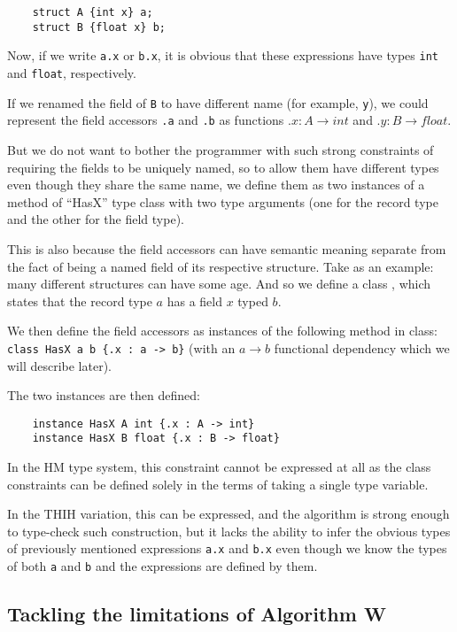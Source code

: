 \begin{lstlisting}
    struct A {int x} a;
    struct B {float x} b;
\end{lstlisting}

Now, if we write \lstinline{a.x} or \lstinline{b.x}, it is obvious that these expressions have types \lstinline{int} and \lstinline{float}, respectively.

If we renamed the field of \lstinline{B} to have different name (for example, \lstinline{y}), we could represent the field accessors \lstinline{.a} and \lstinline{.b} as functions $.x : A \to int$ and $.y : B \to float$.

But we do not want to bother the programmer with such strong constraints of requiring the fields to be uniquely named, so to allow them have different types even though they share the same name, we define them as two instances of a method of ``HasX'' type class with two type arguments (one for the record type and the other for the field type).

This is also because the field accessors can have semantic meaning separate from the fact of being a named field of its respective structure. Take  as an example: many different structures can have some age. And so we define a class , which states that the record type $a$ has a field $x$ typed $b$.

We then define the field accessors  as instances of the following method in  class: \lstinline|class HasX a b {.x : a -> b}| (with an $a \to b$ functional dependency which we will describe later).

The two instances are then defined:

\begin{lstlisting}
    instance HasX A int {.x : A -> int}
    instance HasX B float {.x : B -> float}
\end{lstlisting}


In the HM type system, this constraint cannot be expressed at all as the class constraints can be defined solely in the terms of taking a single type variable.

In the THIH variation, this can be expressed, and the algorithm is strong enough to type-check such construction, but it lacks the ability to infer the obvious types of previously mentioned expressions \lstinline{a.x} and \lstinline{b.x} even though we know the types of both \lstinline{a} and \lstinline{b} and the expressions are defined by them.

\subsection{Tackling the limitations of Algorithm W}

